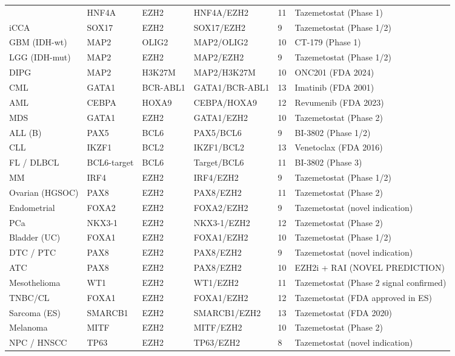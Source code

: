 \documentclass[11pt, a4paper]{article}
\begin{document}
\begin{longtable}{p{3.0cm}p{1.4cm}p{1.4cm}p{1.5cm}p{1.0cm}p{2.8cm}}
  & HNF4A & EZH2 & HNF4A/EZH2
  & 11 & Tazemetostat (Phase 1) \\
iCCA
  & SOX17 & EZH2 & SOX17/EZH2
  & 9 & Tazemetostat (Phase 1/2) \\
GBM (IDH-wt)
  & MAP2 & OLIG2 & MAP2/OLIG2
  & 10 & CT-179 (Phase 1) \\
LGG (IDH-mut)
  & MAP2 & EZH2 & MAP2/EZH2
  & 9 & Tazemetostat (Phase 1/2) \\
DIPG
  & MAP2 & H3K27M & MAP2/H3K27M
  & 10 & ONC201 (FDA 2024) \\
CML
  & GATA1 & BCR-ABL1
  & GATA1/BCR-ABL1
  & 13 & Imatinib (FDA 2001) \\
AML
  & CEBPA & HOXA9 & CEBPA/HOXA9
  & 12 & Revumenib (FDA 2023) \\
MDS
  & GATA1 & EZH2 & GATA1/EZH2
  & 10 & Tazemetostat (Phase 2) \\
ALL (B)
  & PAX5 & BCL6 & PAX5/BCL6
  & 9 & BI-3802 (Phase 1/2) \\
CLL
  & IKZF1 & BCL2 & IKZF1/BCL2
  & 13 & Venetoclax (FDA 2016) \\
FL / DLBCL
  & BCL6-target & BCL6
  & Target/BCL6
  & 11 & BI-3802 (Phase 3) \\
MM
  & IRF4 & EZH2 & IRF4/EZH2
  & 9 & Tazemetostat (Phase 1/2) \\
Ovarian (HGSOC)
  & PAX8 & EZH2 & PAX8/EZH2
  & 11 & Tazemetostat (Phase 2) \\
Endometrial
  & FOXA2 & EZH2 & FOXA2/EZH2
  & 9 & Tazemetostat (novel
       indication) \\
PCa
  & NKX3-1 & EZH2 & NKX3-1/EZH2
  & 12 & Tazemetostat (Phase 2) \\
Bladder (UC)
  & FOXA1 & EZH2 & FOXA1/EZH2
  & 10 & Tazemetostat (Phase 1/2) \\
DTC / PTC
  & PAX8 & EZH2 & PAX8/EZH2
  & 9 & Tazemetostat (novel
       indication) \\
ATC
  & PAX8 & EZH2 & PAX8/EZH2
  & 10 & EZH2i + RAI
       (NOVEL PREDICTION) \\
Mesothelioma
  & WT1 & EZH2 & WT1/EZH2
  & 11 & Tazemetostat (Phase 2
       signal confirmed) \\
TNBC/CL
  & FOXA1 & EZH2 & FOXA1/EZH2
  & 12 & Tazemetostat
       (FDA approved in ES) \\
Sarcoma (ES)
  & SMARCB1 & EZH2
  & SMARCB1/EZH2
  & 13 & Tazemetostat (FDA 2020) \\
Melanoma
  & MITF & EZH2 & MITF/EZH2
  & 10 & Tazemetostat (Phase 2) \\
NPC / HNSCC
  & TP63 & EZH2 & TP63/EZH2
  & 8 & Tazemetostat (novel
       indication) \\
\end{longtable}
\end{document}
